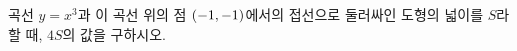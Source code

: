 곡선 $y=x^3$과 이 곡선 위의 점 $(-1{,}\mkern3mu\mathopen{}-1)$에서의 접선으로 둘러싸인 도형의 넓이를 $S$라 할 때, $4S$의 값을 구하시오.
